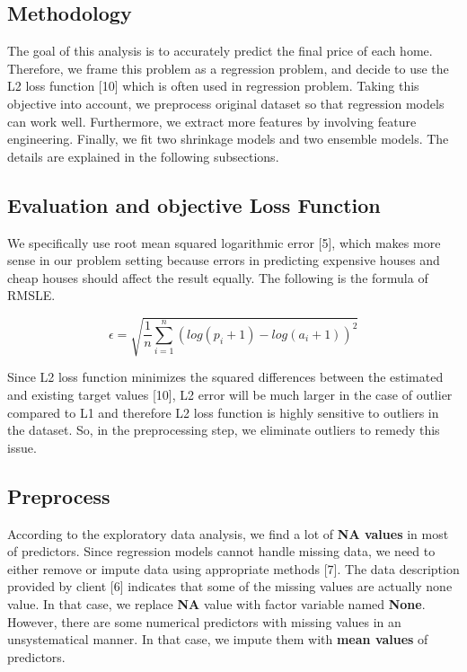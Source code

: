 \documentclass[a4paper]{article}
\begin{document}
\begin{flushleft}
\section{Methodology}

The goal of this analysis is to accurately predict the final price of each home. Therefore, we frame this problem as a regression problem, and decide to use the L2 loss function [10] which is often used in regression problem. Taking this objective into account, we preprocess original dataset so that regression models can work well. Furthermore, we extract more features by involving feature engineering. Finally, we fit two shrinkage models and two ensemble models. The details are explained in the following subsections.

\subsection{Evaluation and objective Loss Function}

We specifically use root mean squared logarithmic error [5], which makes more sense in our problem setting because errors in predicting expensive houses and cheap houses should affect the result equally. The following is the formula of RMSLE. \newline

$$
\epsilon = \sqrt{\frac{1}{n} \sum_{i=1}^{n} (log(p_{i} + 1) - log(a_{i} + 1))^2}
$$

Since L2 loss function minimizes the squared differences between the estimated and existing target values [10], L2 error will be much larger in the case of outlier compared to L1 and therefore L2 loss function is highly sensitive to outliers in the dataset. So, in the preprocessing step, we eliminate outliers to remedy this issue. \newline

\subsection{Preprocess}
According to the exploratory data analysis, we find a lot of \textbf{NA values} in most of predictors. Since regression models cannot handle missing data, we need to either remove or impute data using appropriate methods [7]. The data description provided by client [6] indicates that some of the missing values are actually none value. In that case, we replace \textbf{NA} value with factor variable named \textbf{None}. However, there are some numerical predictors with missing values in an unsystematical manner. In that case, we impute them with \textbf{mean values} of predictors. \newline


\end{flushleft}
\end{document}
